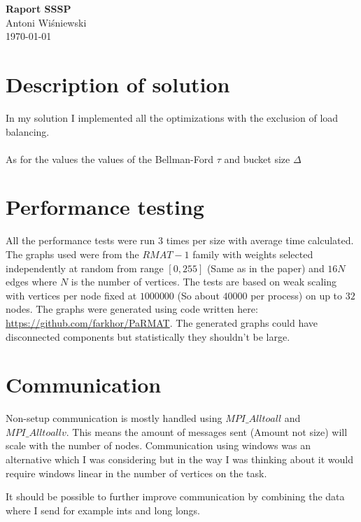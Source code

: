 \documentclass[a4paper,13pt,nontitlepage,onecolumn]{mwart}
\begin{document}
\Large\textbf{Raport SSSP}\\
\large{Antoni Wiśniewski}\\
\large{\today}

\large{
\vspace{.5cm}
\section{Description of solution}
In my solution I implemented all the optimizations with the exclusion of load balancing. \\ \\

As for the values the values of the Bellman-Ford $\tau$ and bucket size $\Delta$

\section{Performance testing}
All the performance tests were run 3 times per size with average time calculated. The graphs used were from the $RMAT-1$ family with weights selected independently at random from range $[0, 255]$ (Same as in the paper) and $16N$ edges where $N$ is the number of vertices. The tests are based on weak scaling with vertices per node fixed at $1000 000$ (So about $40 000$ per process) on up to $32$ nodes. The graphs were generated using code written here: \url{https://github.com/farkhor/PaRMAT}. The generated graphs could have disconnected components but statistically they shouldn't be large.
}

\section{Communication}
Non-setup communication is mostly handled using $MPI\_Alltoall$ and $MPI\_Alltoallv$. This means the amount of messages sent (Amount not size) will scale with the number of nodes. Communication using windows was an alternative which I was considering but in the way I was thinking about it would require windows linear in the number of vertices on the task.

It should be possible to further improve communication by combining the data where I send for example ints and long longs.
\end{document}
